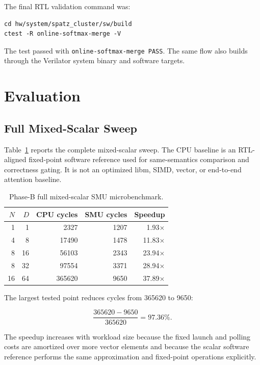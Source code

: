 \documentclass[conference]{IEEEtran}
\begin{document}
The final RTL validation command was:

\begin{verbatim}
cd hw/system/spatz_cluster/sw/build
ctest -R online-softmax-merge -V
\end{verbatim}

The test passed with \texttt{online-softmax-merge PASS}. The same flow also
builds through the Verilator system binary and software targets.

\section{Evaluation}

\subsection{Full Mixed-Scalar Sweep}

Table~\ref{tab:full-mixed} reports the complete mixed-scalar sweep. The CPU
baseline is an RTL-aligned fixed-point software reference used for
same-semantics comparison and correctness gating. It is not an optimized
libm, SIMD, vector, or end-to-end attention baseline.

\begin{table}[t]
\centering
\caption{Phase-B full mixed-scalar SMU microbenchmark.}
\label{tab:full-mixed}
\begin{tabular}{rrrrr}
\toprule
$N$ & $D$ & CPU cycles & SMU cycles & Speedup \\
\midrule
1 & 1 & 2327 & 1207 & 1.93$\times$ \\
4 & 8 & 17490 & 1478 & 11.83$\times$ \\
8 & 16 & 56103 & 2343 & 23.94$\times$ \\
8 & 32 & 97554 & 3371 & 28.94$\times$ \\
16 & 64 & 365620 & 9650 & 37.89$\times$ \\
\bottomrule
\end{tabular}
\end{table}

The largest tested point reduces cycles from 365620 to 9650:

\begin{equation}
\frac{365620 - 9650}{365620} = 97.36\%.
\end{equation}

The speedup increases with workload size because the fixed launch and polling
costs are amortized over more vector elements and because the scalar software
reference performs the same approximation and fixed-point operations
explicitly.
\end{document}
